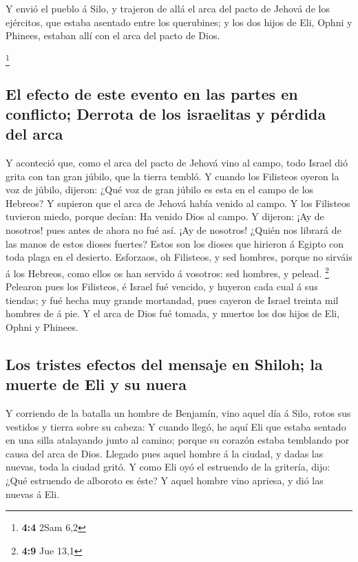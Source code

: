  Y envió el pueblo á Silo, y trajeron de allá el arca del
pacto de Jehová de los ejércitos, que estaba asentado entre los
querubines; y los dos hijos de Eli, Ophni y Phinees, estaban allí con el
arca del pacto de Dios.

\footnote{\textbf{4:4} 2Sam 6,2}

\hypertarget{el-efecto-de-este-evento-en-las-partes-en-conflicto-derrota-de-los-israelitas-y-puxe9rdida-del-arca}{%
\subsection{El efecto de este evento en las partes en conflicto; Derrota
de los israelitas y pérdida del
arca}\label{el-efecto-de-este-evento-en-las-partes-en-conflicto-derrota-de-los-israelitas-y-puxe9rdida-del-arca}}

 Y aconteció que, como el arca del pacto de Jehová vino al
campo, todo Israel dió grita con tan gran júbilo, que la tierra tembló.
 Y cuando los Filisteos oyeron la voz de júbilo, dijeron:
¿Qué voz de gran júbilo es esta en el campo de los Hebreos? Y supieron
que el arca de Jehová había venido al campo.  Y los
Filisteos tuvieron miedo, porque decían: Ha venido Dios al campo. Y
dijeron: ¡Ay de nosotros! pues antes de ahora no fué así. 
¡Ay de nosotros! ¿Quién nos librará de las manos de estos dioses
fuertes? Estos son los dioses que hirieron á Egipto con toda plaga en el
desierto.  Esforzaos, oh Filisteos, y sed hombres, porque
no sirváis á los Hebreos, como ellos os han servido á vosotros: sed
hombres, y pelead. \footnote{\textbf{4:9} Jue 13,1} 
Pelearon pues los Filisteos, é Israel fué vencido, y huyeron cada cual á
sus tiendas; y fué hecha muy grande mortandad, pues cayeron de Israel
treinta mil hombres de á pie.  Y el arca de Dios fué
tomada, y muertos los dos hijos de Eli, Ophni y Phinees.

\hypertarget{los-tristes-efectos-del-mensaje-en-shiloh-la-muerte-de-eli-y-su-nuera}{%
\subsection{Los tristes efectos del mensaje en Shiloh; la muerte de Eli
y su
nuera}\label{los-tristes-efectos-del-mensaje-en-shiloh-la-muerte-de-eli-y-su-nuera}}

 Y corriendo de la batalla un hombre de Benjamín, vino
aquel día á Silo, rotos sus vestidos y tierra sobre su cabeza:
 Y cuando llegó, he aquí Eli que estaba sentado en una
silla atalayando junto al camino; porque su corazón estaba temblando por
causa del arca de Dios. Llegado pues aquel hombre á la ciudad, y dadas
las nuevas, toda la ciudad gritó.  Y como Eli oyó el
estruendo de la gritería, dijo: ¿Qué estruendo de alboroto es éste? Y
aquel hombre vino apriesa, y dió las nuevas á Eli.

